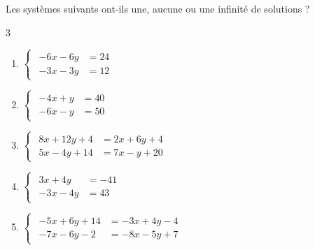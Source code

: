 {\newpage

\begin{Exercice}
Les systèmes suivants ont-ils une, aucune ou une infinité de solutions ?
\vspace{-0.5cm}
\begin{multicols}{3}
\begin{enumerate}[itemsep=1em]
	\item \begin{minipage}[t]{\linewidth} $\begin{cases}\begin{aligned}-6x-6y &=24\\-3x-3y &=12\end{aligned}\end{cases}$\end{minipage}
	\item \begin{minipage}[t]{\linewidth} $\begin{cases}\begin{aligned}-4x+y &=40\\-6x-y &=50\end{aligned}\end{cases}$\end{minipage}
	\item \begin{minipage}[t]{\linewidth} $\begin{cases}\begin{aligned}8x+12y+4 &=2x+6y+4\\5x-4y+14 &=7x-y+20\end{aligned}\end{cases}$\end{minipage}
	\item \begin{minipage}[t]{\linewidth} $\begin{cases}\begin{aligned}3x+4y &=-41\\-3x-4y &=43\end{aligned}\end{cases}$\end{minipage}
	\item \begin{minipage}[t]{\linewidth} $\begin{cases}\begin{aligned}-5x+6y+14 &=-3x+4y-4\\-7x-6y-2 &=-8x-5y+7\end{aligned}\end{cases}$\end{minipage}

\end{enumerate}
\end{multicols}
\end{Exercice}}
